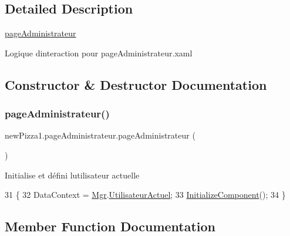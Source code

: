 \subsection{Detailed Description}
\hyperlink{classnewPizza1_1_1pageAdministrateur}{page\+Administrateur} 

Logique d\textquotesingle{}interaction pour page\+Administrateur.\+xaml 

\subsection{Constructor \& Destructor Documentation}
\mbox{\label{classnewPizza1_1_1pageAdministrateur_a3df7325db92c6908055020fc136b6684}} 
\subsubsection{\texorpdfstring{page\+Administrateur()}{pageAdministrateur()}}
{\footnotesize\ttfamily new\+Pizza1.\+page\+Administrateur.\+page\+Administrateur (\begin{DoxyParamCaption}{ }\end{DoxyParamCaption})\hspace{0.3cm}{\ttfamily [inline]}}



Initialise et défini l\textquotesingle{}utilisateur actuelle 


\begin{DoxyCode}
31         \{
32             DataContext = \hyperlink{classnewPizza1_1_1pageAdministrateur_a875c5374259f61887e976a3ba2d6c2e1}{Mgr}.\hyperlink{classModele_1_1Manager_aa00c4632bd15b247d6b6793a6797dc82}{UtilisateurActuel};
33             \hyperlink{classnewPizza1_1_1pageAdministrateur_a8ce68fc7fc92670f56ef3dabb906c9d0}{InitializeComponent}();
34         \}
\end{DoxyCode}


\subsection{Member Function Documentation}
\mbox{\label{classnewPizza1_1_1pageAdministrateur_a8ce68fc7fc92670f56ef3dabb906c9d0}} 
